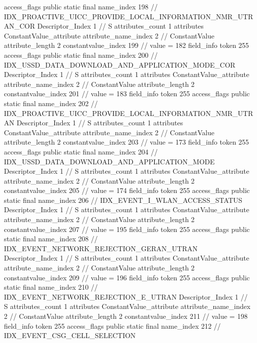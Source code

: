 {{{{{				access_flags	public static final
				name_index	198		// IDX_PROACTIVE_UICC_PROVIDE_LOCAL_INFORMATION_NMR_UTRAN_COR
				Descriptor_Index	1		// S
				attributes_count	1
				attributes {
				ConstantValue_attribute {
					attribute_name_index	2		// ConstantValue
					attribute_length	2
					constantvalue_index	199		// value = 182
				}
				}
			}
			field_info {
				token	255
				access_flags	public static final
				name_index	200		// IDX_USSD_DATA_DOWNLOAD_AND_APPLICATION_MODE_COR
				Descriptor_Index	1		// S
				attributes_count	1
				attributes {
				ConstantValue_attribute {
					attribute_name_index	2		// ConstantValue
					attribute_length	2
					constantvalue_index	201		// value = 183
				}
				}
			}
			field_info {
				token	255
				access_flags	public static final
				name_index	202		// IDX_PROACTIVE_UICC_PROVIDE_LOCAL_INFORMATION_NMR_UTRAN
				Descriptor_Index	1		// S
				attributes_count	1
				attributes {
				ConstantValue_attribute {
					attribute_name_index	2		// ConstantValue
					attribute_length	2
					constantvalue_index	203		// value = 173
				}
				}
			}
			field_info {
				token	255
				access_flags	public static final
				name_index	204		// IDX_USSD_DATA_DOWNLOAD_AND_APPLICATION_MODE
				Descriptor_Index	1		// S
				attributes_count	1
				attributes {
				ConstantValue_attribute {
					attribute_name_index	2		// ConstantValue
					attribute_length	2
					constantvalue_index	205		// value = 174
				}
				}
			}
			field_info {
				token	255
				access_flags	public static final
				name_index	206		// IDX_EVENT_I_WLAN_ACCESS_STATUS
				Descriptor_Index	1		// S
				attributes_count	1
				attributes {
				ConstantValue_attribute {
					attribute_name_index	2		// ConstantValue
					attribute_length	2
					constantvalue_index	207		// value = 195
				}
				}
			}
			field_info {
				token	255
				access_flags	public static final
				name_index	208		// IDX_EVENT_NETWORK_REJECTION_GERAN_UTRAN
				Descriptor_Index	1		// S
				attributes_count	1
				attributes {
				ConstantValue_attribute {
					attribute_name_index	2		// ConstantValue
					attribute_length	2
					constantvalue_index	209		// value = 196
				}
				}
			}
			field_info {
				token	255
				access_flags	public static final
				name_index	210		// IDX_EVENT_NETWORK_REJECTION_E_UTRAN
				Descriptor_Index	1		// S
				attributes_count	1
				attributes {
				ConstantValue_attribute {
					attribute_name_index	2		// ConstantValue
					attribute_length	2
					constantvalue_index	211		// value = 198
				}
				}
			}
			field_info {
				token	255
				access_flags	public static final
				name_index	212		// IDX_EVENT_CSG_CELL_SELECTION
}}}}}

